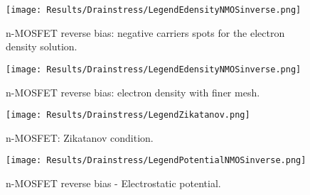 \clearpage 



\begin{figure}[!h]
\centering
{}
\hspace{0.06\textwidth}
\hspace{0.04\textwidth}
{\texttt{[image: Results/Drainstress/LegendEdensityNMOSinverse.png]}}
\caption{n-MOSFET reverse bias: negative carriers spots for the electron density solution.}
\label{fig: negative carriers MOS}
\end{figure}

\begin{figure}[!h]
\centering
{}
\hspace{0.06\textwidth}
\hspace{0.04\textwidth}
{\texttt{[image: Results/Drainstress/LegendEdensityNMOSinverse.png]}}
\caption{n-MOSFET reverse bias: electron density with finer mesh.}
\label{fig: drain stress mos 13000}
\end{figure}

\begin{figure}[!h]
\centering
{}
\hspace{0.06\textwidth}
\hspace{0.04\textwidth}
{\texttt{[image: Results/Drainstress/LegendZikatanov.png]}}
\caption{n-MOSFET: Zikatanov condition.}
\label{fig: zikatanov mos}
\end{figure}

\clearpage

\begin{figure}[!h]
\centering

\hspace{0.06\textwidth}
\hspace{0.04\textwidth}
{\texttt{[image: Results/Drainstress/LegendPotentialNMOSinverse.png]}}
\caption{n-MOSFET reverse bias - Electrostatic potential.}
\label{fig: pot MOS negative}
\end{figure}


